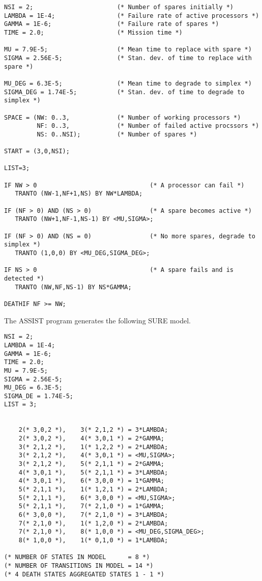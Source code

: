 \begin{verbatim}
NSI = 2;                       (* Number of spares initially *)
LAMBDA = 1E-4;                 (* Failure rate of active processors *)
GAMMA = 1E-6;                  (* Failure rate of spares *)
TIME = 2.0;                    (* Mission time *)

MU = 7.9E-5;                   (* Mean time to replace with spare *)
SIGMA = 2.56E-5;               (* Stan. dev. of time to replace with spare *)
 
MU_DEG = 6.3E-5;               (* Mean time to degrade to simplex *)
SIGMA_DEG = 1.74E-5;           (* Stan. dev. of time to degrade to simplex *)
  
SPACE = (NW: 0..3,             (* Number of working processors *)
         NF: 0..3,             (* Number of failed active procssors *)
         NS: 0..NSI);          (* Number of spares *)
  
START = (3,0,NSI);

LIST=3;

IF NW > 0                               (* A processor can fail *)
   TRANTO (NW-1,NF+1,NS) BY NW*LAMBDA; 
  
IF (NF > 0) AND (NS > 0)                (* A spare becomes active *)
   TRANTO (NW+1,NF-1,NS-1) BY <MU,SIGMA>;
  
IF (NF > 0) AND (NS = 0)                (* No more spares, degrade to simplex *)
   TRANTO (1,0,0) BY <MU_DEG,SIGMA_DEG>;

IF NS > 0                               (* A spare fails and is detected *)
   TRANTO (NW,NF,NS-1) BY NS*GAMMA; 
  
DEATHIF NF >= NW;
\end{verbatim}

The ASSIST program generates the following SURE model.

\begin{verbatim}
NSI = 2;
LAMBDA = 1E-4;
GAMMA = 1E-6;
TIME = 2.0;
MU = 7.9E-5;
SIGMA = 2.56E-5;
MU_DEG = 6.3E-5;
SIGMA_DE = 1.74E-5;
LIST = 3;


    2(* 3,0,2 *),    3(* 2,1,2 *) = 3*LAMBDA;
    2(* 3,0,2 *),    4(* 3,0,1 *) = 2*GAMMA;
    3(* 2,1,2 *),    1(* 1,2,2 *) = 2*LAMBDA;
    3(* 2,1,2 *),    4(* 3,0,1 *) = <MU,SIGMA>;
    3(* 2,1,2 *),    5(* 2,1,1 *) = 2*GAMMA;
    4(* 3,0,1 *),    5(* 2,1,1 *) = 3*LAMBDA;
    4(* 3,0,1 *),    6(* 3,0,0 *) = 1*GAMMA;
    5(* 2,1,1 *),    1(* 1,2,1 *) = 2*LAMBDA;
    5(* 2,1,1 *),    6(* 3,0,0 *) = <MU,SIGMA>;
    5(* 2,1,1 *),    7(* 2,1,0 *) = 1*GAMMA;
    6(* 3,0,0 *),    7(* 2,1,0 *) = 3*LAMBDA;
    7(* 2,1,0 *),    1(* 1,2,0 *) = 2*LAMBDA;
    7(* 2,1,0 *),    8(* 1,0,0 *) = <MU_DEG,SIGMA_DEG>;
    8(* 1,0,0 *),    1(* 0,1,0 *) = 1*LAMBDA;

(* NUMBER OF STATES IN MODEL      = 8 *)
(* NUMBER OF TRANSITIONS IN MODEL = 14 *)
(* 4 DEATH STATES AGGREGATED STATES 1 - 1 *)
\end{verbatim}

